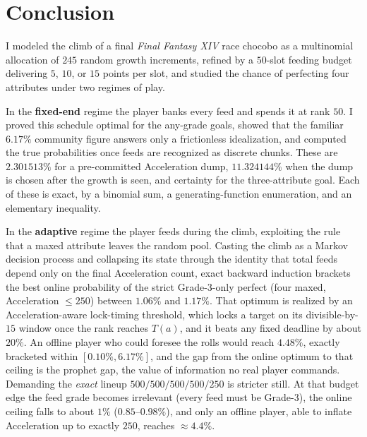 \documentclass[11pt]{article}
\theoremstyle{remark}
\begin{document}
\section{Conclusion}\label{sec:conclusion}

I modeled the climb of a final \emph{Final Fantasy XIV} race chocobo as a
multinomial allocation of $245$ random growth increments, refined by a $50$-slot
feeding budget delivering $5$, $10$, or $15$ points per slot, and studied the chance
of perfecting four attributes under two regimes of play.

In the \textbf{fixed-end} regime the player banks every feed and spends it at rank
$50$. I proved this schedule optimal for the any-grade goals, showed that the
familiar $6.17\%$ community figure answers only a frictionless idealization, and
computed the true probabilities once feeds are recognized as discrete chunks. These
are $2.301513\%$ for a pre-committed Acceleration dump, $11.324144\%$ when the dump is
chosen after the growth is seen, and certainty for the three-attribute goal. Each of
these is exact, by a binomial sum, a generating-function enumeration, and an
elementary inequality.

In the \textbf{adaptive} regime the player feeds during the climb, exploiting the rule
that a maxed attribute leaves the random pool. Casting the climb as a Markov decision
process and collapsing its state through the identity that total feeds depend only on
the final Acceleration count, exact backward induction brackets the best online
probability of the strict Grade-3-only perfect (four maxed, Acceleration $\le 250$)
between $1.06\%$ and $1.17\%$. That optimum is realized by an Acceleration-aware
lock-timing threshold, which locks a target on its divisible-by-$15$ window once the
rank reaches $T(a)$, and it beats any fixed deadline by about $20\%$. An offline
player who could foresee the rolls would reach $4.48\%$, exactly bracketed within
$[0.10\%,6.17\%]$, and the gap from the online optimum to that ceiling is the prophet
gap, the value of information no real player commands. Demanding the \emph{exact}
lineup $500/500/500/500/250$ is stricter still. At that budget edge the feed grade
becomes irrelevant (every feed must be Grade-3), the online ceiling falls to about
$1\%$ ($0.85$--$0.98\%$), and only an offline player, able to inflate Acceleration up
to exactly $250$, reaches $\approx 4.4\%$.
\end{document}
